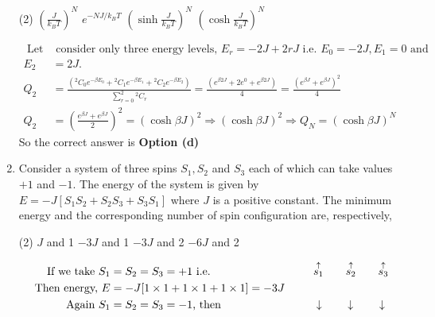 \begin{enumerate}
	{	}
	\begin{tasks}(2)
		\task[\textbf{a.}] $\left(\frac{J}{k_{B} T}\right)^{N}$
		\task[\textbf{b.}]$e^{-N J / k_{B} T}$
		\task[\textbf{c.}] $\left(\sinh \frac{J}{k_{B} T}\right)^{N}$
		\task[\textbf{d.}] $\left(\cosh \frac{J}{k_{B} T}\right)^{N}$
	\end{tasks}
	\begin{answer}
		\begin{align*}
		\text { Let us}&\text{ consider only three energy levels, } E_{r}=-2 J+2 r J \text { i.e. } E_{0}=-2 J, E_{1}=0 \text { and }\\
		E_{2}&=2 J.\\
		Q_{2}&=\frac{\left({ }^{2} C_{0} e^{-\beta E_{0}}+{ }^{2} C_{1} e^{-\beta E_{1}}+{ }^{2} C_{2} e^{-\beta E_{2}}\right)}{\sum_{r=0}^{2}{ }^{2} C_{r}}=\frac{\left(e^{\beta 2 J}+2 e^{0}+e^{\beta 2 J}\right)}{4}=\frac{\left(e^{\beta J}+e^{\beta J}\right)^{2}}{4} \\
		Q_{2}&=\left(\frac{e^{\beta J}+e^{\beta J}}{2}\right)^{2}=(\cosh \beta J)^{2} \Rightarrow(\cosh \beta J)^{2} \Rightarrow Q_{N}=(\cosh \beta J)^{N}
		\end{align*}
		So the correct answer is \textbf{Option (d)}
	\end{answer}
	\item Consider a system of three spins $S_{1}, S_{2}$ and $S_{3}$ each of which can take values $+1$ and $-1$. The energy of the system is given by $E=-J\left[S_{1} S_{2}+S_{2} S_{3}+S_{3} S_{1}\right]$ where $J$ is a positive constant. The minimum energy and the corresponding number of spin configuration are, respectively,
	{	}
	\begin{tasks}(2)
		\task[\textbf{a.}]$J$ and 1
		\task[\textbf{b.}]$-3 J$ and 1
		\task[\textbf{c.}]$-3 J$ and 2
		\task[\textbf{d.}]  $-6 J$ and 2
	\end{tasks}
	\begin{answer}
		\begin{align*}
		\text{If we take }S_{1}&=S_{2}=S_{3}=+1\text{ i.e. }\hspace{3cm}\stackrel{\uparrow}{s_1}\qquad \stackrel{\uparrow}{s_2}\qquad\stackrel{\uparrow}{s_3}\\
		\text { Then energy, } E&=-J[1 \times 1+1 \times 1+1 \times 1]=-3 J\\
		\text { Again } S_{1}&=S_{2}=S_{3}=-1 \text {, then }\hspace{2.8cm}\downarrow\qquad \ \downarrow\qquad \ \downarrow\\

\end{align*}
\end{answer}
\end{enumerate}
